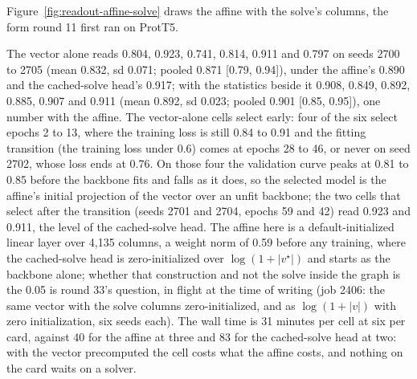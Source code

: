 Figure~\ref{fig:readout-affine-solve} draws the affine with the solve's columns, the form
round 11 first ran on ProtT5.





The vector alone reads 0.804, 0.923, 0.741, 0.814, 0.911 and 0.797 on seeds 2700 to
2705 (mean 0.832, sd 0.071; pooled 0.871 [0.79, 0.94]), under the affine's 0.890 and
the cached-solve head's 0.917; with the statistics beside it 0.908, 0.849, 0.892,
0.885, 0.907 and 0.911 (mean 0.892, sd 0.023; pooled 0.901 [0.85, 0.95]), one number
with the affine. The vector-alone cells select early: four of the six select epochs 2
to 13, where the training loss is still 0.84 to 0.91 and the fitting transition (the
training loss under 0.6) comes at epochs 28 to 46, or never on seed 2702, whose loss
ends at 0.76. On those four the validation curve peaks at 0.81 to 0.85 before the
backbone fits and falls as it does, so the selected model is the affine's initial
projection of the vector over an unfit backbone; the two cells that select after the
transition (seeds 2701 and 2704, epochs 59 and 42) read 0.923 and 0.911, the level of
the cached-solve head. The affine here is a default-initialized linear layer over
4,135 columns, a weight norm of 0.59 before any training, where the cached-solve head
is zero-initialized over $\log(1 + |v^\star|)$ and starts as the backbone alone; whether
that construction and not the solve inside the graph is the 0.05 is round 33's
question, in flight at the time of writing (job 2406: the same vector with the solve
columns zero-initialized, and as $\log(1 + |v|)$ with zero initialization, six seeds
each). The wall time is 31 minutes per cell at six per card, against 40 for the affine
at three and 83 for the cached-solve head at two: with the vector precomputed the cell
costs what the affine costs, and nothing on the card waits on a solver.

